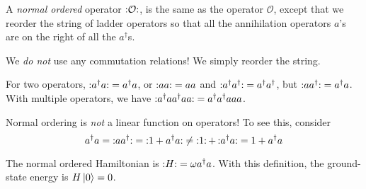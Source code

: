 \begin{definition}
  A \emph{normal ordered} operator $\mathop{:}\nolimits\!\mathcal{O}\!\mathop{:}\nolimits$, is the same as the operator $\mathcal{O}$, except that we reorder the string of ladder operators so that all the annihilation operators $a$'s are on the right of all the $a^\dagger$s.
\end{definition}
\begin{leftbar}
  \begin{remark}
    We \emph{do not} use any commutation relations! We simply reorder the string.
  \end{remark}
\end{leftbar}
\begin{example}[]
  For two operators, $\mathop{:}\nolimits\!a^{\dagger} a\!\mathop{:}\nolimits = a^{\dagger} a$, or $\mathop{:}\nolimits\!a a\!\mathop{:}\nolimits = aa$ and $\mathop{:}\nolimits\!a^{\dagger} a^{\dagger}\!\mathop{:}\nolimits = a^{\dagger} a^{\dagger}$, but $\mathop{:}\nolimits\!a a^{\dagger}\!\mathop{:}\nolimits = a^{\dagger} a$. With multiple operators, we have $\mathop{:}\nolimits\!a^{\dagger} a a^{\dagger} a a\!\mathop{:}\nolimits = a^{\dagger} a^{\dagger} a a a$.
\end{example}
\begin{leftbar}
  \begin{remark}
    Normal ordering is \emph{not} a linear function on operators! 
    To see this, consider
    \begin{equation}
      a^{\dagger} a = \normalorder{a a^{\dagger}} = \normalorder{1 + a^{\dagger} a} \neq \normalorder{1} + \normalorder{a^{\dagger} a} = 1 + a^{\dagger} a
    \end{equation}
  \end{remark}
\end{leftbar}

The normal ordered Hamiltonian is $\mathop{:}\nolimits\!H\!\mathop{:}\nolimits = \omega a^\dagger a$. With this definition, the ground-state energy is $H \ket{0} = 0$.
